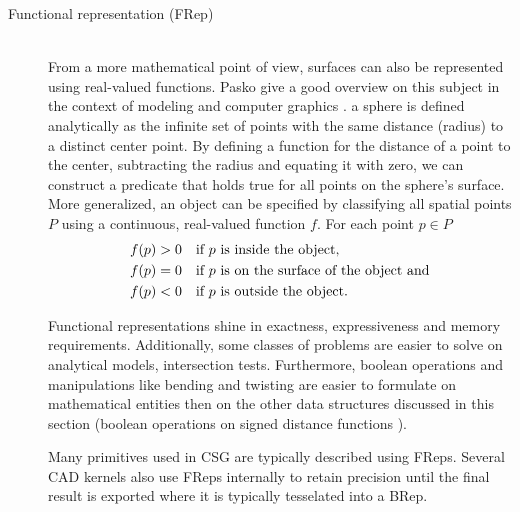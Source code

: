 \begin{description}
	\item[Functional representation (FRep)] \hfill \\
	From a more mathematical point of view, surfaces can also be represented using real-valued functions.
	Pasko \etal give a good overview on this subject in the context of modeling and computer graphics \cite{frep}.
	\Eg a sphere is defined analytically as the infinite set of points with the same distance (radius) to a distinct center point.
	By defining a function for the distance of a point to the center, subtracting the radius and equating it with zero, we can construct a predicate that holds true for all points on the sphere's surface.
	More generalized, an object can be specified by classifying all spatial points $P$ using a continuous, real-valued function $f$. For each point $p \in P$
	\begin{align}
		f(p) &> 0 \quad \text{if $p$ is inside the object,}               \notag \\
		f(p) &= 0 \quad \text{if $p$ is on the surface of the object and} \notag \\
		f(p) &< 0 \quad \text{if $p$ is outside the object.}              \notag
	\end{align}
	
	Functional representations shine in exactness, expressiveness and memory requirements.
	Additionally, some classes of problems are easier to solve on analytical models, \eg intersection tests.
	Furthermore, boolean operations and manipulations like bending and twisting are easier to formulate on mathematical entities then on the other data structures discussed in this section (\cf boolean operations on signed distance functions \cite{extended_marching_cubes}).
	
	Many primitives used in CSG are typically described using FReps.
	Several CAD kernels also use FReps internally to retain precision until the final result is exported where it is typically tesselated into a BRep.
	
\end{description}
